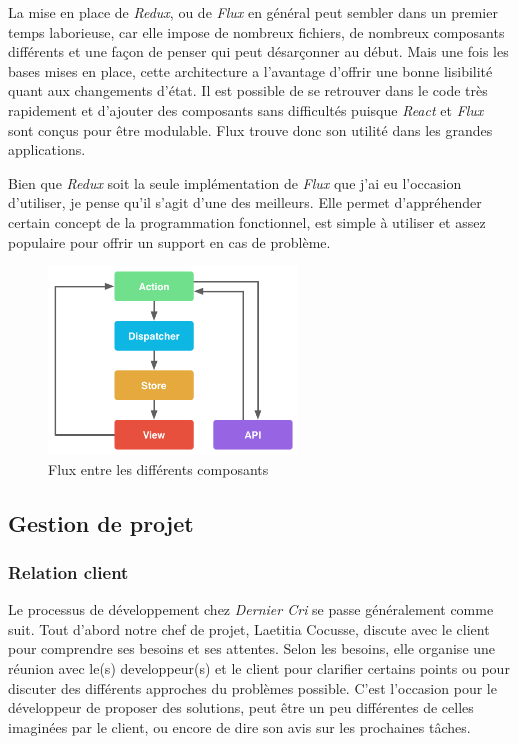 \documentclass[12pt,a4paper]{article}
\begin{document}
  La mise en place de \emph{Redux}, ou de \emph{Flux} en général peut
  sembler dans un premier temps laborieuse, car elle impose de nombreux
  fichiers, de nombreux composants différents et une façon de penser qui
  peut désarçonner au début. Mais une fois les bases mises en place, cette
  architecture a l'avantage d'offrir une bonne lisibilité quant aux
  changements d'état. Il est possible de se retrouver dans le code très
  rapidement et d'ajouter des composants sans difficultés puisque
  \emph{React} et \emph{Flux} sont conçus pour être modulable. Flux trouve
  donc son utilité dans les grandes applications.

  \bigskip

  Bien que \emph{Redux} soit la seule implémentation de \emph{Flux} que
  j'ai eu l'occasion d'utiliser, je pense qu'il s'agit d'une des
  meilleurs. Elle permet d'appréhender certain concept de la programmation
  fonctionnel, est simple à utiliser et assez populaire pour offrir un
  support en cas de problème.

  \bigskip

  \begin{figure}[h]
    \centering
    \includegraphics[height=5cm]{figures/react.png}
    \caption{Flux entre les différents composants}
  \end{figure}

  \subsection{Gestion de projet}\label{gestion-de-projet}

  \subsubsection{Relation client}\label{relation-client}

  \bigskip

  Le processus de développement chez \emph{Dernier Cri} se passe
  généralement comme suit. Tout d'abord notre chef de projet, Laetitia
  Cocusse, discute avec le client pour comprendre ses besoins et ses
  attentes. Selon les besoins, elle organise une réunion avec le(s)
  developpeur(s) et le client pour clarifier certains points ou pour
  discuter des différents approches du problèmes possible. C'est
  l'occasion pour le développeur de proposer des solutions, peut être un
  peu différentes de celles imaginées par le client, ou encore de dire son
  avis sur les prochaines tâches.
\end{document}
